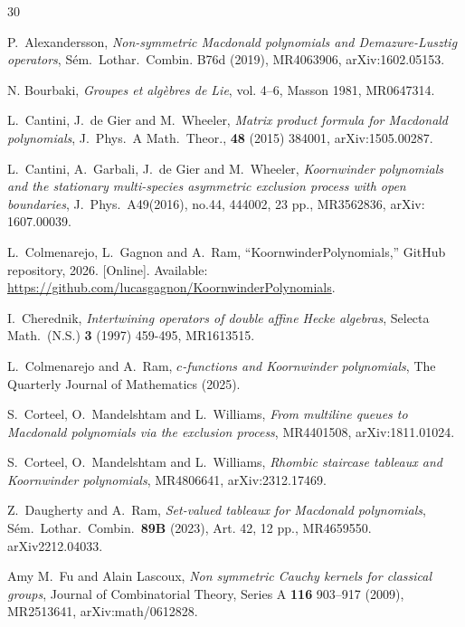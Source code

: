 \documentclass[11pt]{article}
\theoremstyle{plain}
\theoremstyle{definition}
\theoremstyle{remark}
\numberwithin{equation}{section}
\newcounter{r}
\newcounter{s}
\begin{document}
 \begin{thebibliography}{30}

  P.\ Alexandersson, \emph{Non-symmetric Macdonald 
 polynomials and Demazure-Lusztig operators},  S\'em.\ Lothar.\ Combin. B76d (2019), MR4063906,
arXiv:1602.05153. 


  N. Bourbaki, {\em Groupes et alg\`ebres de Lie}, vol. 4--6, Masson 1981, MR0647314.

 L.\ Cantini, J.\ de Gier and M.\ Wheeler,
\emph{Matrix product formula for Macdonald polynomials},
 J.\ Phys.\ A Math.\ Theor., \textbf{48} (2015) 384001, arXiv:1505.00287.

  L.\ Cantini, A.\ Garbali, J.\ de Gier and M.\ Wheeler,
 \emph{Koornwinder polynomials and the stationary multi-species asymmetric exclusion process with open boundaries},
 J.\ Phys.\ A49(2016), no.44, 444002, 23 pp., MR3562836,  arXiv: 1607.00039.

L.~Colmenarejo, L.~Gagnon and A.~Ram, ``KoornwinderPolynomials,'' GitHub repository, 2026. [Online]. Available: \url{https://github.com/lucasgagnon/KoornwinderPolynomials}.

  I.\ Cherednik, \emph{Intertwining operators of double affine Hecke algebras},
 Selecta Math.\ (N.S.) \textbf{3} (1997) 459-495, MR1613515.

  L.\ Colmenarejo and A.\ Ram, \emph{$c$-functions and Koornwinder polynomials}, 
The Quarterly Journal of Mathematics (2025).

  S.\ Corteel, O.\ Mandelshtam and L.\ Williams,
 \emph{From multiline queues to Macdonald polynomials via the exclusion process},
MR4401508,  arXiv:1811.01024.

 S.\ Corteel, O.\ Mandelshtam and L.\ Williams,
\emph{Rhombic staircase tableaux and Koornwinder polynomials},
MR4806641, arXiv:2312.17469. 


  Z.\ Daugherty and A.\ Ram, 
 \emph{Set-valued tableaux for Macdonald polynomials},
 S\'em.\ Lothar.\ Combin.\ \textbf{89B} (2023), Art. 42, 12 pp., MR4659550.
 arXiv2212.04033. 
 

  Amy M.\ Fu and Alain Lascoux, \emph{Non symmetric Cauchy kernels for classical groups},
 Journal of Combinatorial Theory, Series A \textbf{116} 903–917 (2009), MR2513641,
 arXiv:math/0612828.



\end{thebibliography}
\end{document}
